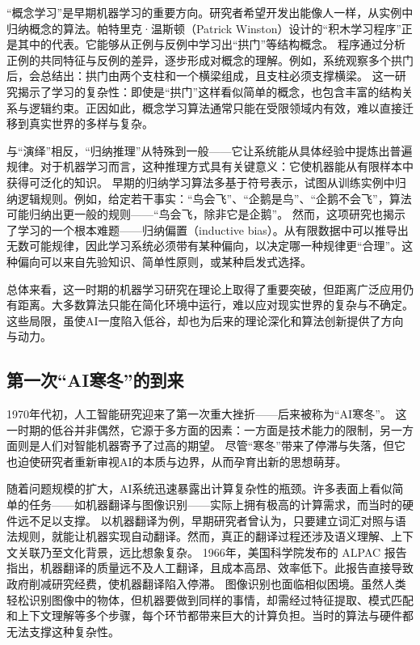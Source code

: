 “概念学习”是早期机器学习的重要方向。研究者希望开发出能像人一样，从实例中归纳概念的算法。帕特里克·温斯顿（Patrick Winston）设计的“积木学习程序”正是其中的代表。它能够从正例与反例中学习出“拱门”等结构概念。  
程序通过分析正例的共同特征与反例的差异，逐步形成对概念的理解。例如，系统观察多个拱门后，会总结出：拱门由两个支柱和一个横梁组成，且支柱必须支撑横梁。  
这一研究揭示了学习的复杂性：即使是“拱门”这样看似简单的概念，也包含丰富的结构关系与逻辑约束。正因如此，概念学习算法通常只能在受限领域内有效，难以直接迁移到真实世界的多样与复杂。

与“演绎”相反，“归纳推理”从特殊到一般——它让系统能从具体经验中提炼出普遍规律。对于机器学习而言，这种推理方式具有关键意义：它使机器能从有限样本中获得可泛化的知识。  
早期的归纳学习算法多基于符号表示，试图从训练实例中归纳逻辑规则。例如，给定若干事实：“鸟会飞”、“企鹅是鸟”、“企鹅不会飞”，算法可能归纳出更一般的规则——“鸟会飞，除非它是企鹅”。  
然而，这项研究也揭示了学习的一个根本难题——归纳偏置（inductive bias）。从有限数据中可以推导出无数可能规律，因此学习系统必须带有某种偏向，以决定哪一种规律更“合理”。这种偏向可以来自先验知识、简单性原则，或某种启发式选择。

总体来看，这一时期的机器学习研究在理论上取得了重要突破，但距离广泛应用仍有距离。大多数算法只能在简化环境中运行，难以应对现实世界的复杂与不确定。这些局限，虽使AI一度陷入低谷，却也为后来的理论深化和算法创新提供了方向与动力。

\subsection{第一次“AI寒冬”的到来}

1970年代初，人工智能研究迎来了第一次重大挫折——后来被称为“AI寒冬”。  
这一时期的低谷并非偶然，它源于多方面的因素：一方面是技术能力的限制，另一方面则是人们对智能机器寄予了过高的期望。  
尽管“寒冬”带来了停滞与失落，但它也迫使研究者重新审视AI的本质与边界，从而孕育出新的思想萌芽。

随着问题规模的扩大，AI系统迅速暴露出计算复杂性的瓶颈。许多表面上看似简单的任务——如机器翻译与图像识别——实际上拥有极高的计算需求，而当时的硬件远不足以支撑。  
以机器翻译为例，早期研究者曾认为，只要建立词汇对照与语法规则，就能让机器实现自动翻译。然而，真正的翻译过程还涉及语义理解、上下文关联乃至文化背景，远比想象复杂。  
1966年，美国科学院发布的 ALPAC 报告指出，机器翻译的质量远不及人工翻译，且成本高昂、效率低下。此报告直接导致政府削减研究经费，使机器翻译陷入停滞。  
图像识别也面临相似困境。虽然人类轻松识别图像中的物体，但机器要做到同样的事情，却需经过特征提取、模式匹配和上下文理解等多个步骤，每个环节都带来巨大的计算负担。当时的算法与硬件都无法支撑这种复杂性。

